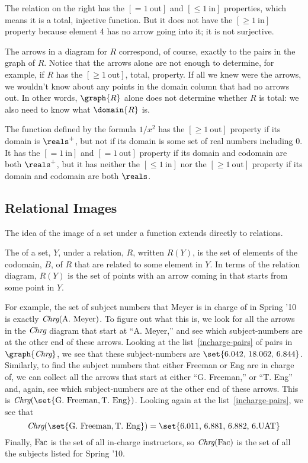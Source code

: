 The relation on the right has the $[=1\ \text{out}]$ and $[\le
  1\ \text{in}]$ properties, which means it is a total, injective
function.  But it does not have the $[\ge 1\ \text{in}]$ property
because element 4 has no arrow going into it; it is
not surjective.

The arrows in a diagram for $R$ correspond, of course, exactly to the
pairs in the graph of $R$.  Notice that the arrows alone are not
enough to determine, for example, if $R$ has the $[\ge
  1\ \text{out}]$, total, property.  If all we knew were the arrows,
we wouldn't know about any points in the domain column that had no
arrows out.  In other words, $\graph{R}$ alone does not determine
whether $R$ is total: we also need to know what $\domain{R}$ is.

\begin{example}
  The function defined by the formula $1/x^2$ has the $[\ge 1\
  \text{out}]$ property if its domain is $\reals^+$, but not if its domain
  is some set of real numbers including 0.  It has the $[=1\ \text{in}]$
  and $[=1\ \text{out}]$ property if its domain and codomain are both
  $\reals^+$, but it has neither the $[\le 1\ \text{in}]$ nor the $[\ge 1\
  \text{out}]$ property if its domain and codomain are both $\reals$.
\end{example}

\subsection{Relational Images}
The idea of the image of a set under a function extends directly to
relations.

\begin{definition}
  The %
 of a set, $Y$, under a relation, $R$, written $R(Y)$,
  is the set of elements of the codomain, $B$, of $R$ that are related to
  some element in $Y$.  In terms of the relation diagram, $R(Y)$ is the
  set of points with an arrow coming in that starts from some point in $Y$.
\iffalse
, namely,
\[
R(Y) \eqdef \set{b \in B \suchthat yRb \text{ for some } y \in Y}.
\]\fi
\end{definition}

For example, the set of subject numbers that Meyer is in charge of in
Spring '10 is exactly $\textit{Chrg}(\text{A. Meyer})$.  To figure out what
this is, we look for all the arrows in the $\textit{Chrg}$ diagram that
start at ``A. Meyer,'' and see which subject-numbers are at the other
end of these arrows.  Looking at the list~\eqref{incharge-pairs} of
pairs in $\graph{\inchrg}$, we see that these subject-numbers are
$\set{\text{6.042, 18.062, 6.844}}$.  Similarly, to find the subject
numbers that either Freeman or Eng are in charge of, we can collect
all the arrows that start at either ``G. Freeman,'' or ``T. Eng'' and,
again, see which subject-numbers are at the other end of these arrows.
This is $\inchrg(\set{\text{G. Freeman}, \text{T. Eng}})$.  Looking
again at the list~\eqref{incharge-pairs}, we see that
\[
\inchrg(\set{\text{G. Freeman}, \text{T. Eng}}) = \set{\text{6.011, 6.881, 6.882, 6.UAT}}
\]
Finally, $\text{Fac}$ is the set of all in-charge instructors, so
$\textit{Chrg}(\text{Fac})$ is the set of all the subjects listed for Spring
'10.

